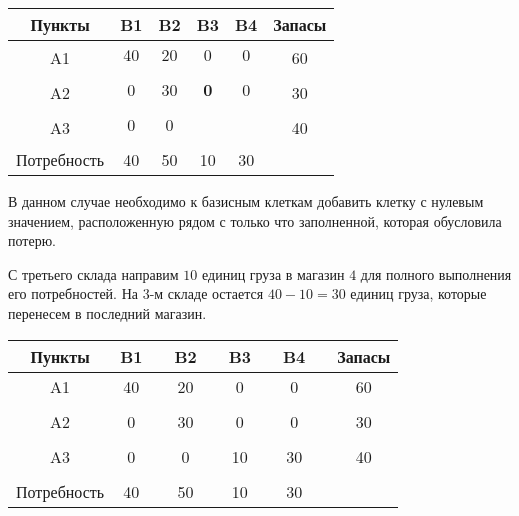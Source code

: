 \documentclass[a4paper,12pt]{article}
\begin{document}
	\begin{center}
		\begin{tabular}{|c|c|c|c|c|c|c|c|c|c}
			\hline
			Пункты & \multicolumn{2}{c|}{B1} & \multicolumn{2}{c|}{B2} & \multicolumn{2}{c|}{B3} & \multicolumn{2}{c|}{B4} & \multicolumn{1}{c|}{Запасы} \\ \hline
			\multirow{2}{*}{A1} & \multicolumn{2}{c|}{40} & \multicolumn{2}{c|}{20} & \multicolumn{2}{c|}{0} & \multicolumn{2}{c|}{0} & \multicolumn{1}{c|}{\multirow{2}{*}{60}} \\ \cline{2-9}
			&  &  &  &  &  &  &  &  & \multicolumn{1}{c|}{} \\ \hline
			\multirow{2}{*}{A2} & \multicolumn{2}{c|}{0} & \multicolumn{2}{c|}{30} & \multicolumn{2}{c|}{\textbf{0}} & \multicolumn{2}{c|}{0} & \multicolumn{1}{c|}{\multirow{2}{*}{30}} \\ \cline{2-9}
			&  &  &  &  &  &  &  &  & \multicolumn{1}{c|}{} \\ \hline
			\multirow{2}{*}{A3} & \multicolumn{2}{c|}{0} & \multicolumn{2}{c|}{0} & \multicolumn{2}{c|}{} & \multicolumn{2}{c|}{} & \multicolumn{1}{c|}{\multirow{2}{*}{40}} \\ \cline{2-9}
			&  &  &  &  &  &  &  &  & \multicolumn{1}{c|}{} \\ \hline
			Потребность & \multicolumn{2}{c|}{40} & \multicolumn{2}{c|}{50} & \multicolumn{2}{c|}{10} & \multicolumn{2}{c|}{30} &  \\ \cline{1-9}
		\end{tabular}
	\end{center}

	В данном случае необходимо к базисным клеткам добавить клетку с нулевым значением, расположенную рядом с только что заполненной, которая обусловила потерю.
	
	С третьего склада направим $10$ единиц груза в магазин $4$ для полного выполнения его потребностей. На $3$-м складе  остается $40 - 10 = 30$ единиц груза, которые перенесем в последний магазин.
	
	\begin{center}
		\begin{tabular}{|c|c|c|c|c|c|c|c|c|c|}
			\hline
			Пункты & B1 &  & B2 &  & B3 &  & B4 &  & Запасы \\ \hline
			A1 & 40 &  & 20 &  & 0 &  & 0 &  & 60 \\ \hline
			&  &  &  &  &  &  &  &  &  \\ \hline
			A2 & 0 &  & 30 &  & 0 &  & 0 &  & 30 \\ \hline
			&  &  &  &  &  &  &  &  &  \\ \hline
			A3 & 0 &  & 0 &  & 10 &  & 30 &  & 40 \\ \hline
			&  &  &  &  &  &  &  &  &  \\ \hline
			Потребность & 40 &  & 50 &  & 10 &  & 30 &  &  \\ \hline
		\end{tabular}
	\end{center}
\end{document}
